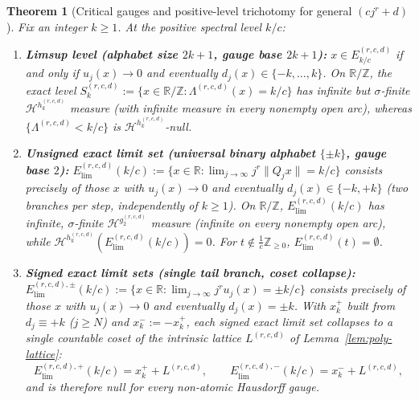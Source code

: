 \documentclass[11pt]{article}
\newtheorem{theorem}{Theorem}
\theoremstyle{definition}
\theoremstyle{remark}
\newcommand{\R}{\mathbb{R}}
\newcommand{\Z}{\mathbb{Z}}
\newcommand{\Lam}{\Lambda}
\begin{document}
\begin{theorem}[Critical gauges and positive-level trichotomy for general $(cj^r+d)$]\label{thm:poly-gauge-trichotomy}
Fix an integer $k\ge1$. At the positive spectral level $k/c$:
\begin{enumerate}[label=(\roman*),leftmargin=2em]
\item \textbf{Limsup level (alphabet size $2k+1$, gauge base $2k+1$):}
$x\in E_{k/c}^{(r,c,d)}$ if and only if $u_j(x)\to0$ and eventually
$d_j(x)\in\{-k,\dots,k\}$. On $\R/\Z$, the exact level
$S_k^{(r,c,d)}:=\{x\in\R/\Z:\Lam^{(r,c,d)}(x)=k/c\}$ has infinite but
$\sigma$-finite $\mathcal H^{h_k^{(r,c,d)}}$ measure (with infinite measure in
every nonempty open arc), whereas $\{\Lam^{(r,c,d)}<k/c\}$ is
$\mathcal H^{h_k^{(r,c,d)}}$-null.
\item \textbf{Unsigned exact limit set (universal binary alphabet $\{\pm k\}$, gauge base $2$):}
$E_{\mathrm{lim}}^{(r,c,d)}(k/c):=\{x\in\R:\lim_{j\to\infty}j^r\|Q_jx\|=k/c\}$
consists precisely of those $x$ with $u_j(x)\to0$ and eventually
$d_j(x)\in\{-k,+k\}$ (two branches per step, independently of $k\ge1$). On
$\R/\Z$, $E_{\mathrm{lim}}^{(r,c,d)}(k/c)$ has infinite, $\sigma$-finite
$\mathcal H^{g_2^{(r,c,d)}}$ measure (infinite on every nonempty open arc),
while $\mathcal H^{h_k^{(r,c,d)}}(E_{\mathrm{lim}}^{(r,c,d)}(k/c))=0$. For
$t\notin\frac1c\Z_{\ge0}$, $E_{\mathrm{lim}}^{(r,c,d)}(t)=\emptyset$.
\item \textbf{Signed exact limit sets (single tail branch, coset collapse):}
$E_{\mathrm{lim}}^{(r,c,d),\pm}(k/c):=\{x\in\R:\lim_{j\to\infty}j^ru_j(x)=\pm k/c\}$
consists precisely of those $x$ with $u_j(x)\to0$ and eventually $d_j(x)=\pm k$.
With $x_k^+$ built from $d_j\equiv+k$ ($j\ge N$) and $x_k^-:=-x_k^+$, each signed
exact limit set collapses to a single countable coset of the intrinsic lattice
$L^{(r,c,d)}$ of Lemma~\ref{lem:poly-lattice}:
\[
E_{\mathrm{lim}}^{(r,c,d),+}(k/c)=x_k^+ + L^{(r,c,d)},\qquad
E_{\mathrm{lim}}^{(r,c,d),-}(k/c)=x_k^- + L^{(r,c,d)},
\]
and is therefore null for every non-atomic Hausdorff gauge.
\end{enumerate}
\end{theorem}
\end{document}
